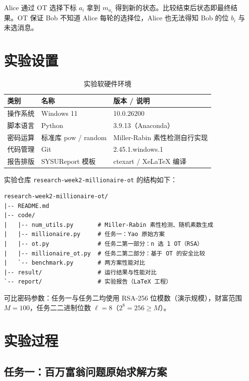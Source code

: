 \documentclass{SYSUReport}
\begin{document}
Alice 通过 OT 选择下标 $a_i$ 拿到 $m_{a_i}$ 得到新的状态。比较结束后状态即最终结果。OT 保证 Bob 不知道 Alice 每轮的选择位，Alice 也无法得知 Bob 的位 $b_i$ 与未选消息。

\section{实验设置}

\begin{table}[htbp]
\centering
\caption{实验软硬件环境}
\label{tab:env}
\begin{tabular}{lll}
\toprule
\textbf{类别} & \textbf{名称} & \textbf{版本 / 说明} \\
\midrule
操作系统 & Windows 11 & 10.0.26200 \\
脚本语言 & Python & 3.9.13（Anaconda）\\
密码运算 & 标准库 pow / random & Miller-Rabin 素性检测自行实现 \\
代码管理 & Git & 2.45.1.windows.1 \\
报告排版 & SYSUReport 模板 & ctexart / XeLaTeX 编译 \\
\bottomrule
\end{tabular}
\end{table}

实验仓库 \texttt{research-week2-millionaire-ot} 的结构如下：

\begin{lstlisting}[caption={实验仓库目录结构}]
research-week2-millionaire-ot/
|-- README.md
|-- code/
|   |-- num_utils.py       # Miller-Rabin 素性检测、随机素数生成
|   |-- millionaire.py     # 任务一：Yao 原始方案
|   |-- ot.py              # 任务二第一部分：n 选 1 OT（RSA）
|   |-- millionaire_ot.py  # 任务二第二部分：基于 OT 的安全比较
|   `-- benchmark.py       # 两方案性能对比
|-- result/                # 运行结果与性能对比
`-- report/                # 实验报告（LaTeX 工程）
\end{lstlisting}

可比密码参数：任务一与任务二均使用 RSA-256 位模数（演示规模），财富范围 $M = 100$，任务二二进制位数 $\ell = 8$（$2^8 = 256 \ge M$）。

\section{实验过程}

\subsection{任务一：百万富翁问题原始求解方案}
\end{document}
